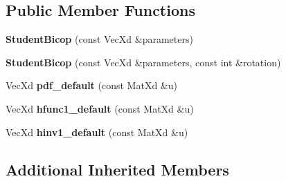 \subsection*{Public Member Functions}
\begin{DoxyCompactItemize}
\item 
\hypertarget{class_student_bicop_a3c022a1efe1060453b3418f1fa55ebaa}{{\bfseries Student\+Bicop} (const Vec\+Xd \&parameters)}\label{class_student_bicop_a3c022a1efe1060453b3418f1fa55ebaa}

\item 
\hypertarget{class_student_bicop_a74ee1a778893916dd4fe0745562d784c}{{\bfseries Student\+Bicop} (const Vec\+Xd \&parameters, const int \&rotation)}\label{class_student_bicop_a74ee1a778893916dd4fe0745562d784c}

\item 
\hypertarget{class_student_bicop_a398dcd183989b356e63b7b929b062b39}{Vec\+Xd {\bfseries pdf\+\_\+default} (const Mat\+Xd \&u)}\label{class_student_bicop_a398dcd183989b356e63b7b929b062b39}

\item 
\hypertarget{class_student_bicop_ac7b273165caa154d649bb0f2e25833c6}{Vec\+Xd {\bfseries hfunc1\+\_\+default} (const Mat\+Xd \&u)}\label{class_student_bicop_ac7b273165caa154d649bb0f2e25833c6}

\item 
\hypertarget{class_student_bicop_abf90b4ed51ca88f166e6ed679c22e183}{Vec\+Xd {\bfseries hinv1\+\_\+default} (const Mat\+Xd \&u)}\label{class_student_bicop_abf90b4ed51ca88f166e6ed679c22e183}

\end{DoxyCompactItemize}
\subsection*{Additional Inherited Members}
